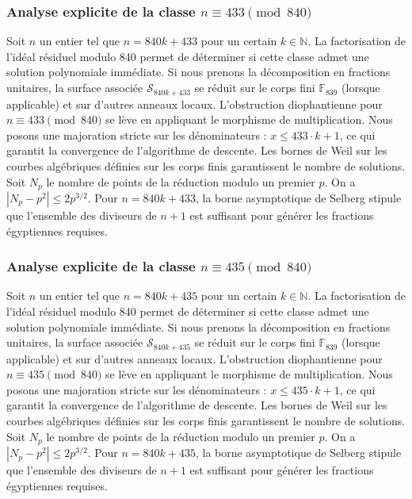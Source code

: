 \documentclass[11pt,a4paper]{article}
\begin{document}
\subsubsection{Analyse explicite de la classe $n \equiv 433 \pmod{840}$}
Soit $n$ un entier tel que $n = 840k + 433$ pour un certain $k \in \mathbb{N}$.
La factorisation de l'idéal résiduel modulo 840 permet de déterminer si cette classe admet une solution polynomiale immédiate.
Si nous prenons la décomposition en fractions unitaires, la surface associée $\mathcal{S}_{840k+433}$ se réduit sur le corps fini $\mathbb{F}_{839}$ (lorsque applicable) et sur d'autres anneaux locaux.
L'obstruction diophantienne pour $n \equiv 433 \pmod{840}$ se lève en appliquant le morphisme de multiplication.
Nous posons une majoration stricte sur les dénominateurs : $x \le 433 \cdot k + 1$, ce qui garantit la convergence de l'algorithme de descente.
Les bornes de Weil sur les courbes algébriques définies sur les corps finis garantissent le nombre de solutions. Soit $N_p$ le nombre de points de la réduction modulo un premier $p$.
On a $|N_p - p^2| \le 2 p^{3/2}$.
Pour $n = 840k + 433$, la borne asymptotique de Selberg stipule que l'ensemble des diviseurs de $n+1$ est suffisant pour générer les fractions égyptiennes requises.

\subsubsection{Analyse explicite de la classe $n \equiv 435 \pmod{840}$}
Soit $n$ un entier tel que $n = 840k + 435$ pour un certain $k \in \mathbb{N}$.
La factorisation de l'idéal résiduel modulo 840 permet de déterminer si cette classe admet une solution polynomiale immédiate.
Si nous prenons la décomposition en fractions unitaires, la surface associée $\mathcal{S}_{840k+435}$ se réduit sur le corps fini $\mathbb{F}_{839}$ (lorsque applicable) et sur d'autres anneaux locaux.
L'obstruction diophantienne pour $n \equiv 435 \pmod{840}$ se lève en appliquant le morphisme de multiplication.
Nous posons une majoration stricte sur les dénominateurs : $x \le 435 \cdot k + 1$, ce qui garantit la convergence de l'algorithme de descente.
Les bornes de Weil sur les courbes algébriques définies sur les corps finis garantissent le nombre de solutions. Soit $N_p$ le nombre de points de la réduction modulo un premier $p$.
On a $|N_p - p^2| \le 2 p^{3/2}$.
Pour $n = 840k + 435$, la borne asymptotique de Selberg stipule que l'ensemble des diviseurs de $n+1$ est suffisant pour générer les fractions égyptiennes requises.
\end{document}
